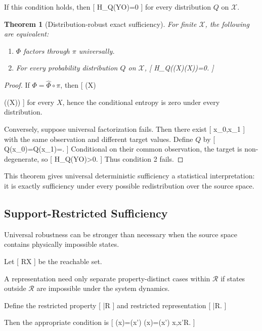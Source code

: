 \documentclass[11pt]{article}
\newtheorem{theorem}{Theorem} \newtheorem{proposition}{Proposition} \newtheorem{lemma}{Lemma} \newtheorem{corollary}{Corollary} \newtheorem{definition}{Definition} \newtheorem{remark}{Remark}
\begin{document}
If this condition holds, then
[
H_Q(Y\mid O)=0
]
for every distribution $Q$ on $\mathcal X$.

\begin{theorem}[Distribution-robust exact sufficiency]
For finite $\mathcal X$, the following are equivalent:

\begin{enumerate}
\item $\Phi$ factors through $\pi$ universally.
\item For every probability distribution $Q$ on $\mathcal X$,
[
H_Q(\Phi(X)\mid\pi(X))=0.
]
\end{enumerate}
\end{theorem}

\begin{proof}
If $\Phi=\widehat{\Phi}\circ\pi$, then
[
\Phi(X)

\widehat{\Phi}(\pi(X))
]
for every $X$, hence the conditional entropy is zero under every distribution.

Conversely, suppose universal factorization fails. Then there exist
[
x_0,x_1
]
with the same observation and different target values. Define $Q$ by
[
Q(x_0)=Q(x_1)=.
]
Conditional on their common observation, the target is non-degenerate, so
[
H_Q(Y\mid O)>0.
]
Thus condition 2 fails.
\end{proof}

This theorem gives universal deterministic sufficiency a statistical interpretation: it is exactly sufficiency under every possible redistribution over the source space.

\subsection{Support-Restricted Sufficiency}

Universal robustness can be stronger than necessary when the source space contains physically impossible states.

Let
[
\mathcal R\subseteq\mathcal X
]
be the reachable set.

A representation need only separate property-distinct cases within $\mathcal R$ if states outside $\mathcal R$ are impossible under the system dynamics.

Define the restricted property
[
\Phi|{\mathcal R}
]
and restricted representation
[
\pi|{\mathcal R}.
]

Then the appropriate condition is
[
\pi(x)=\pi(x')
\Longrightarrow
\Phi(x)=\Phi(x')
\qquad
\forall x,x'\in\mathcal R.
]
\end{document}
